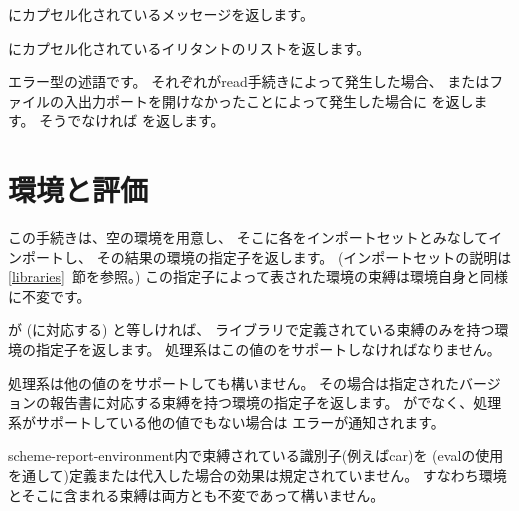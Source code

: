 \begin{entry}{%
}

にカプセル化されているメッセージを返します。

\end{entry}

\begin{entry}{%
}

にカプセル化されているイリタントのリストを返します。

\end{entry}

\begin{entry}{%
}

エラー型の述語です。
それぞれが{\cf read}手続きによって発生した場合、
またはファイルの入出力ポートを開けなかったことによって発生した場合に %
\schtrue{}を返します。
そうでなければ \schfalse{}を返します。

\end{entry}

\section{環境と評価}

\begin{entry}{%
}
\label{environments}

この手続きは、空の環境を用意し、
そこに各をインポートセットとみなしてインポートし、
その結果の環境の指定子を返します。
(インポートセットの説明は\ref{libraries}~節を参照。)
この指定子によって表された環境の束縛は環境自身と同様に不変です。

\end{entry}

\begin{entry}{%
}

が{} (\rfivers{}に対応する) と等しければ、
\rfivers{}ライブラリで定義されている束縛のみを持つ環境の指定子を返します。
処理系はこの値のをサポートしなければなりません。

処理系は他の値のをサポートしても構いません。
その場合は指定されたバージョンの報告書に対応する束縛を持つ環境の指定子を返します。
が{}でなく、処理系がサポートしている他の値でもない場合は
エラーが通知されます。

{\cf scheme-report-environment}内で束縛されている識別子(例えば{\cf car})を
({\cf eval}の使用を通して)定義または代入した場合の効果は規定されていません。
すなわち環境とそこに含まれる束縛は両方とも不変であって構いません。

\end{entry}

